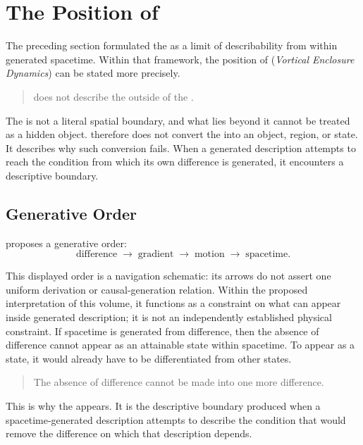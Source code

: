 \section{The Position of \VED{}}

\label{sec:ved}

The preceding section formulated the \DHP{} as a limit of
describability from within generated spacetime.
Within that framework,
the position of \VED{} (\textit{Vortical Enclosure Dynamics})
can be stated more precisely.

\medskip
\begin{quote}
\VED{} does not describe the outside of the \DH{}.
\end{quote}
\medskip

The \DH{} is not a literal spatial boundary,
and what lies beyond it cannot be treated as a hidden object.
\VED{} therefore does not convert the \ungenerated{} into an object,
region, or state.
It describes why such conversion fails.
When a generated description attempts to reach the condition from
which its own difference is generated,
it encounters a descriptive boundary.

\subsection*{Generative Order}

\VED{} proposes a generative order:
\begin{equation}
  \text{difference}
  \;\longrightarrow\;
  \text{gradient}
  \;\longrightarrow\;
  \text{motion}
  \;\longrightarrow\;
  \text{spacetime}.
\end{equation}

This displayed order is a navigation schematic: its arrows do not assert one
uniform derivation or causal-generation relation.  Within the proposed
interpretation of this volume, it functions as a constraint on what can appear
inside generated description; it is not an independently established physical
constraint.
If spacetime is generated from difference,
then the absence of difference cannot appear as an attainable state
within spacetime.
To appear as a state,
it would already have to be differentiated from other states.

\medskip
\begin{quote}
The absence of difference cannot be made into one more difference.
\end{quote}
\medskip

This is why the \DH{} appears.
It is the descriptive boundary produced when a spacetime-generated
description attempts to describe the condition that would remove
the difference on which that description depends.

